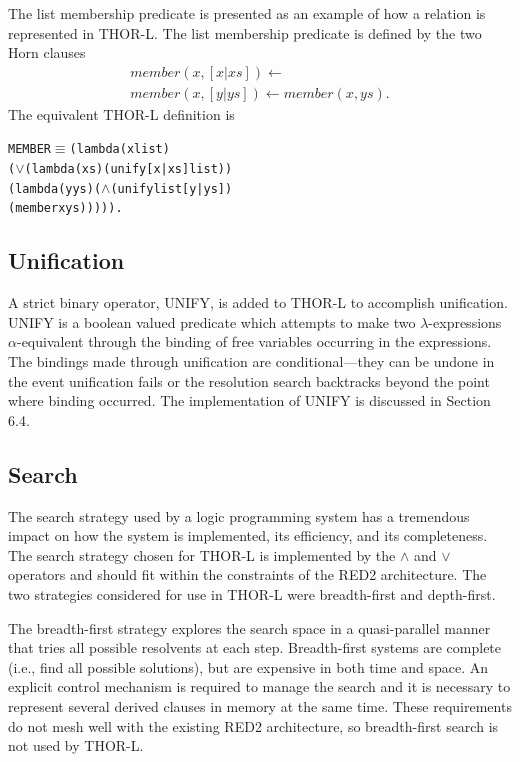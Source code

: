 The list membership predicate is presented as an example of how a relation is
represented in THOR-L. The list membership predicate is defined by the two Horn
clauses
\[
\begin{array}{l}
member(x,[x|xs])\leftarrow\\
member(x,[y|ys])\leftarrow member(x,ys).
\end{array}
\]
The equivalent THOR-L definition is
\begin{alltt}
MEMBER \(\equiv\) (lambda (x list)
  (\(\vee\) (lambda (xs) (unify [x|xs] list))
     (lambda (y ys) (\(\wedge\) (unify list [y|ys])
                       (member x ys))))).
\end{alltt}

\subsection{Unification}

A strict binary operator, UNIFY, is added to THOR-L to accomplish unification.
UNIFY is a boolean valued predicate which attempts to make two
\(\lambda\)-expressions \(\alpha\)-equivalent through the binding of free
variables occurring in the expressions. The bindings made through unification
are conditional---they can be undone in the event unification fails or the
resolution search backtracks beyond the point where binding occurred. The
implementation of UNIFY is discussed in Section 6.4.

\subsection{Search}

The search strategy used by a logic programming system has a tremendous impact
on how the system is implemented, its efficiency, and its completeness. The
search strategy chosen for THOR-L is implemented by the \(\wedge\) and \(\vee\)
operators and
should fit within the constraints of the RED2 architecture. The two strategies
considered for use in THOR-L were breadth-first and depth-first.

The breadth-first strategy explores the search space in a quasi-parallel manner
that tries all possible resolvents at each step. Breadth-first systems are
complete (i.e., find all possible solutions), but are expensive in both time and
space. An explicit control mechanism is required to manage the search and it is
necessary to represent several derived clauses in memory at the same time. These
requirements do not mesh well with the existing RED2 architecture, so
breadth-first search is not used by THOR-L.

